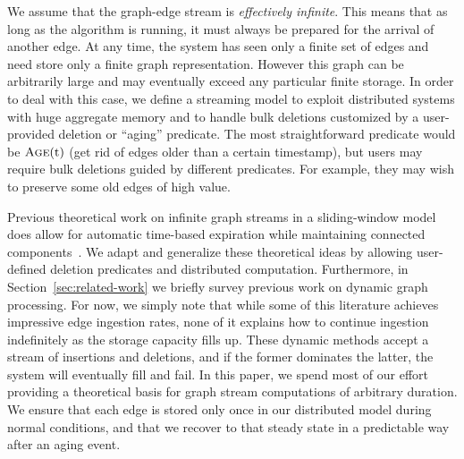 

We assume that the graph-edge stream is {\em effectively infinite}. This means that as long as the algorithm is running, it must always be prepared for the arrival of another edge. At any time, the system has seen only a finite set of edges and need store only a finite graph representation.  However this graph can be arbitrarily large and may eventually exceed any particular finite storage. In
order to deal with this case, we define a streaming model to exploit
distributed systems with huge aggregate memory and to handle bulk deletions
customized by a user-provided deletion or ``aging'' predicate.  The most
straightforward predicate would be $\Call{Age}{\mbox{t}}$ (get rid
of edges older than a certain timestamp), but users may require bulk
deletions guided by different predicates.  For example, they may wish to
preserve some old edges of high value.


Previous theoretical work on infinite graph streams in a sliding-window model
does allow for automatic time-based expiration while maintaining connected
 components~\cite{crouch2013dynamic,mcgregor2014graph}.  We adapt and
 generalize these theoretical ideas by allowing user-defined deletion
 predicates and distributed computation.  Furthermore, in
 Section~\ref{sec:related-work}
 we briefly survey previous work on dynamic graph processing.
 For now, we simply note that while some of this literature achieves impressive
 edge ingestion rates, none of it explains how to continue ingestion
 indefinitely as the storage capacity fills up.  These dynamic methods
 accept a stream of insertions and deletions, and if the former dominates the
 latter, the system will eventually fill and fail.  In this paper, we spend
 most of our effort providing a theoretical basis for graph stream
 computations of arbitrary duration.  We ensure that each edge is
 stored only once in our distributed model during normal conditions, and
 that we recover to that steady state in a predictable way after an
 aging event.

